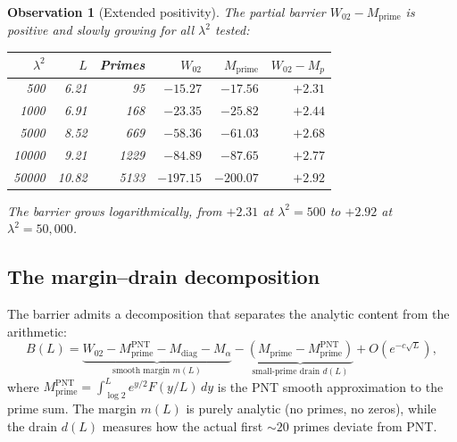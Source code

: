\documentclass[11pt,a4paper]{article}
\newtheorem{observation}{Observation}[section]
\begin{document}
\begin{observation}[Extended positivity]
The partial barrier $W_{02} - M_{\mathrm{prime}}$ is positive and slowly growing for all $\lambda^2$ tested:

\begin{center}
\begin{tabular}{rrrrrr}
\toprule
$\lambda^2$ & $L$ & Primes & $W_{02}$ & $M_{\mathrm{prime}}$ & $W_{02} - M_p$ \\
\midrule
500 & 6.21 & 95 & $-15.27$ & $-17.56$ & $+2.31$ \\
1000 & 6.91 & 168 & $-23.35$ & $-25.82$ & $+2.44$ \\
5000 & 8.52 & 669 & $-58.36$ & $-61.03$ & $+2.68$ \\
10000 & 9.21 & 1229 & $-84.89$ & $-87.65$ & $+2.77$ \\
50000 & 10.82 & 5133 & $-197.15$ & $-200.07$ & $+2.92$ \\
\bottomrule
\end{tabular}
\end{center}
The barrier grows logarithmically, from $+2.31$ at $\lambda^2=500$ to $+2.92$ at $\lambda^2=50{,}000$.
\end{observation}

\subsection{The margin--drain decomposition}

The barrier admits a decomposition that separates the analytic content from the arithmetic:
\begin{equation}\label{eq:margin-drain}
B(L) = \underbrace{W_{02} - M_{\mathrm{prime}}^{\mathrm{PNT}} - M_{\mathrm{diag}} - M_\alpha}_{\text{smooth margin } m(L)} - \underbrace{\left(M_{\mathrm{prime}} - M_{\mathrm{prime}}^{\mathrm{PNT}}\right)}_{\text{small-prime drain } d(L)} + O(e^{-c\sqrt{L}}),
\end{equation}
where $M_{\mathrm{prime}}^{\mathrm{PNT}} = \int_{\log 2}^{L} e^{y/2} F(y/L)\, dy$ is the PNT smooth approximation to the prime sum. The margin $m(L)$ is purely analytic (no primes, no zeros), while the drain $d(L)$ measures how the actual first ${\sim}20$ primes deviate from PNT.
\end{document}

